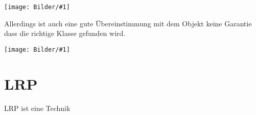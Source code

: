 \documentclass[
  12pt, %
  a4paper, %
  oneside, %
  openany, 
  numbers=noenddot, %
  BCOR=5mm, %
  parskip=half*, %
  thesis, %
]{bfhbook}
\newcommand{\imgText}[2]{
\begin{center}
    \begin{minipage}[t]{0.6\textwidth}
\texttt{[image: Bilder/\#1]}
	\end{minipage}\hfill
    \begin{minipage}[t]{0.4\textwidth}
  #2
    \end{minipage}
\end{center}
}
\begin{document}
\imgText{cat-good-heatmap.png}{ 
Allerdings ist auch eine gute Übereinstimmung mit dem Objekt keine Garantie dass die richtige Klasse gefunden wird.
}

\imgText{cat-bad-heatmap.png}{ 

}

\section{LRP}
\Gls{LRP} ist eine Technik 
\listoffigures
\begingroup
\let\clearpage\relax
\listoftables
\printglossary

\renewcommand\bibname{Literaturverzeichnis}

\printbibliography

\endgroup
\end{document}
